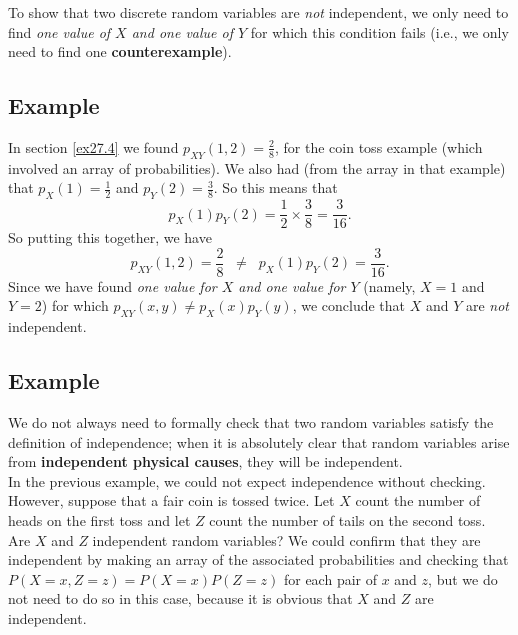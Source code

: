 \noindent To show that two discrete random variables are \textit{not} independent, we only need to find \textit{one value of $X$ and one value of $Y$} for which this condition fails (i.e., we only need to find one \textbf{counterexample}). \label{counterexample}

\subsection{Example}
In section \ref{ex27.4} we found $p_{XY}(1,2) = \frac{2}{8}$, for the coin toss example (which involved an array of probabilities). We also had (from the array in that example) that $p_X(1) = \frac{1}{2}$ and $p_Y(2) = \frac{3}{8}$. So this means that
\[
p_X(1)p_Y(2) = \frac{1}{2}\times\frac{3}{8} = \frac{3}{16}.
\]
So putting this together, we have
\[
p_{XY}(1,2) = \frac{2}{8} \;\; \neq \;\;  p_X(1)p_Y(2) = \frac{3}{16}.
\] 
Since we have found \textit{one value for $X$ and one value for $Y$} (namely, $X = 1$ and $Y = 2$) for which $p_{XY}(x,y) \neq p_X(x)p_Y(y)$, we conclude that $X$ and $Y$ are \textit{not} independent.


\subsection{Example}
We do not always need to formally check that two random variables satisfy the definition of independence; when it is absolutely clear that random variables arise from \textbf{independent physical causes}, they will be independent. \\

\noindent In the previous example, we could not expect independence without checking. \\

\noindent However, suppose that a fair coin is tossed twice. Let $X$ count the number of heads on the first toss and let $Z$ count the number of tails on the second toss. Are $X$ and $Z$ independent random variables? We could confirm that they are independent by making an array of the associated probabilities and checking that $P(X = x,Z=z) = P(X = x)P(Z = z)$ for each pair of $x$ and $z$, but we do not need to do so in this case, because it is obvious that $X$ and $Z$ are independent.


